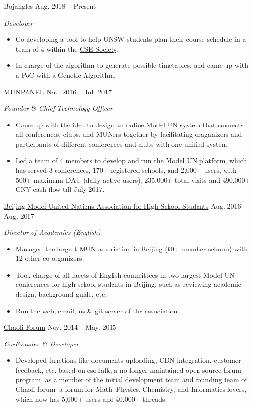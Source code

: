 \documentclass[hidelinks__VERSION__]{adamyi-cv}
\begin{document}
\begin{entrylist}
\entry
{Bojangles}
{Aug. 2018 -- Present}
{\emph{Developer}
\begin{itemize}
\item Co-developing a tool to help UNSW students plan their course schedule in a team of 4 within the \href{https://www.csesoc.unsw.edu.au/}{CSE Society}.
\item In charge of the algorithm to generate possible timetables, and came up with a PoC with a Genetic Algorithm.
\end{itemize}}



\entry
{\href{https://www.munpanel.com}{MUNPANEL}}
{Nov. 2016 -- Jul. 2017}
{\emph{Founder \& Chief Technology Officer}
\begin{itemize}
\item Came up with the idea to design an online Model UN system that connects all conferences, clubs, and MUNers together by facilitating oraganizers and participants of different conferences and clubs with one unified system.
\item Led a team of 4 members to develop and run the Model UN platform, which has served 3 conferences, 170+ registered schools, and 2,000+ users, with 500+ maximum DAU (daily active users), 235,000+ total visits and 490,000+ CNY cash flow till July 2017.
\end{itemize}}


\entry
{\href{https://bjmun.cn}{Beijing Model United Nations Association for High School Students}}
{Aug. 2016 -- Aug. 2017}
{\emph{Director of Academics (English)}
\begin{itemize}
\item Managed the largest MUN association in Beijing (60+ member schools) with 12 other co-organizers.
\item Took charge of all facets of English committees in two largest Model UN conferences for high school students in Beijing, such as reviewing academic design, background guide, etc.
\item Run the web, email, ns \& git server of the association.
\end{itemize}}


\entry
{\href{https://chaoli.club}{Chaoli Forum}}
{Nov. 2014 -- May. 2015}
{\emph{Co-Founder \& Developer}
\begin{itemize}
\item Developed functions like documents uploading, CDN integration, customer feedback, etc. based on esoTalk, a no-longer maintained open source forum program, as a member of the initial development team and founding team of Chaoli forum, a forum for Math, Physics, Chemistry, and Informatics lovers, which now has 5,000+ users and 40,000+ threads.
\end{itemize}}




\end{entrylist}
\end{document}
